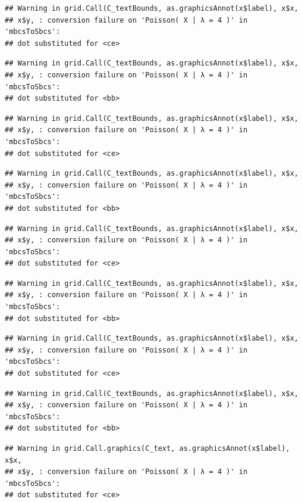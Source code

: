 \documentclass[
  11pt]{report}
\begin{document}
\begin{verbatim}
## Warning in grid.Call(C_textBounds, as.graphicsAnnot(x$label), x$x,
## x$y, : conversion failure on 'Poisson( X | λ = 4 )' in 'mbcsToSbcs':
## dot substituted for <ce>
\end{verbatim}

\begin{verbatim}
## Warning in grid.Call(C_textBounds, as.graphicsAnnot(x$label), x$x,
## x$y, : conversion failure on 'Poisson( X | λ = 4 )' in 'mbcsToSbcs':
## dot substituted for <bb>
\end{verbatim}

\begin{verbatim}
## Warning in grid.Call(C_textBounds, as.graphicsAnnot(x$label), x$x,
## x$y, : conversion failure on 'Poisson( X | λ = 4 )' in 'mbcsToSbcs':
## dot substituted for <ce>
\end{verbatim}

\begin{verbatim}
## Warning in grid.Call(C_textBounds, as.graphicsAnnot(x$label), x$x,
## x$y, : conversion failure on 'Poisson( X | λ = 4 )' in 'mbcsToSbcs':
## dot substituted for <bb>
\end{verbatim}

\begin{verbatim}
## Warning in grid.Call(C_textBounds, as.graphicsAnnot(x$label), x$x,
## x$y, : conversion failure on 'Poisson( X | λ = 4 )' in 'mbcsToSbcs':
## dot substituted for <ce>
\end{verbatim}

\begin{verbatim}
## Warning in grid.Call(C_textBounds, as.graphicsAnnot(x$label), x$x,
## x$y, : conversion failure on 'Poisson( X | λ = 4 )' in 'mbcsToSbcs':
## dot substituted for <bb>
\end{verbatim}

\begin{verbatim}
## Warning in grid.Call(C_textBounds, as.graphicsAnnot(x$label), x$x,
## x$y, : conversion failure on 'Poisson( X | λ = 4 )' in 'mbcsToSbcs':
## dot substituted for <ce>
\end{verbatim}

\begin{verbatim}
## Warning in grid.Call(C_textBounds, as.graphicsAnnot(x$label), x$x,
## x$y, : conversion failure on 'Poisson( X | λ = 4 )' in 'mbcsToSbcs':
## dot substituted for <bb>
\end{verbatim}

\begin{verbatim}
## Warning in grid.Call.graphics(C_text, as.graphicsAnnot(x$label), x$x,
## x$y, : conversion failure on 'Poisson( X | λ = 4 )' in 'mbcsToSbcs':
## dot substituted for <ce>
\end{verbatim}
\end{document}
